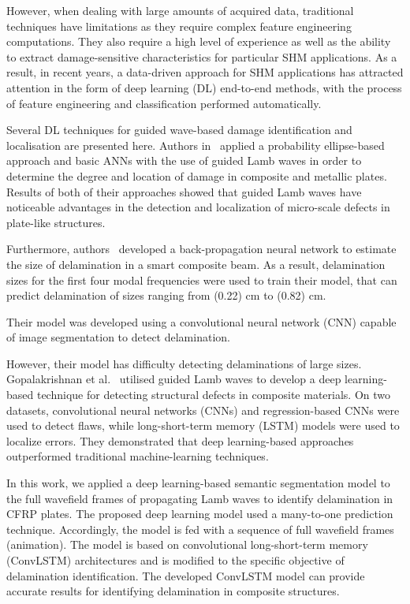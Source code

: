 \documentclass{IOS-Book-Article}
\begin{document}
However, when dealing with large amounts of acquired data, traditional techniques have limitations as they require complex feature engineering computations.
They also require a high level of experience as well as the ability to extract damage-sensitive characteristics for particular SHM applications.
As a result, in recent years, a data-driven approach for SHM applications has attracted attention in the form of deep learning (DL) end-to-end methods, with the process of feature engineering and classification performed automatically.

Several DL techniques for guided wave-based damage identification and localisation are presented here.
Authors in~\cite{DeFenza2015a} applied a probability ellipse-based approach and 
basic ANNs with the use of guided Lamb waves in order to  determine the degree 
and location of damage in composite and metallic plates. Results of both of 
their approaches showed that guided Lamb waves have noticeable advantages in 
the detection and localization of micro-scale defects in plate-like 
structures. 

Furthermore, authors~\cite{okafor1996delamination} developed a back-propagation neural network to estimate the size of delamination in a smart composite beam.
As a result, delamination sizes for the first four modal frequencies were used to train their model, that can predict delamination of sizes ranging from (0.22) cm to (0.82) cm.

Their model was developed using a convolutional neural network (CNN) capable of image segmentation to detect delamination.

However, their model has difficulty detecting delaminations of large sizes.
Gopalakrishnan et al.~\cite{Gopalakrishnan2021} utilised guided Lamb waves to develop a deep learning-based technique for detecting structural defects in composite materials.
On two datasets, convolutional neural networks (CNNs) and regression-based CNNs were used to detect flaws, while long-short-term memory (LSTM) models were used to localize errors.
They demonstrated that deep learning-based approaches outperformed traditional machine-learning techniques.

In this work, we applied a deep learning-based semantic segmentation model to the full wavefield frames of propagating Lamb waves to identify delamination in CFRP plates.
The proposed deep learning model used a many-to-one prediction technique.
Accordingly, the model is fed with a sequence of full wavefield frames (animation).
The model is based on convolutional long-short-term memory (ConvLSTM) architectures and is modified to the specific objective of delamination identification.
The developed ConvLSTM model can provide accurate results for identifying delamination in composite structures.
\end{document}
